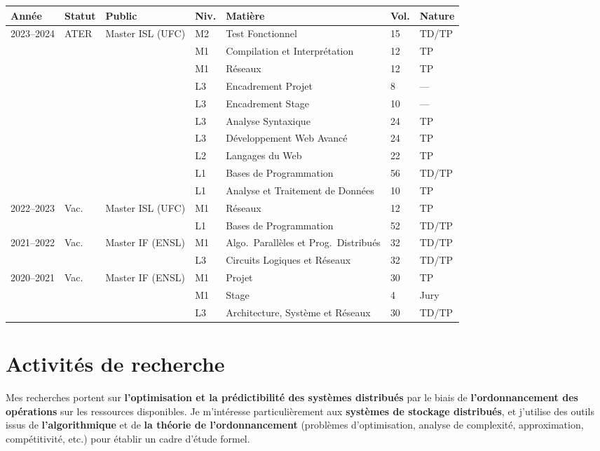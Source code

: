 \documentclass[12pt]{article}
\begin{document}
\begin{center}
    \footnotesize
    \begin{tabularx}{\linewidth}{p{2cm}lp{3cm}lXll}
        \toprule
        \textbf{Année} & \textbf{Statut} & \textbf{Public} & \textbf{Niv.} & \textbf{Matière} & \textbf{Vol.} & \textbf{Nature} \tabularnewline
        \midrule
        2023--2024 & ATER & Master ISL (UFC) & M2 & Test Fonctionnel & 15 & TD/TP \tabularnewline
        & & & M1 & Compilation et Interprétation & 12 & TP \tabularnewline
        & & & M1 & Réseaux & 12 & TP \tabularnewline
        & & & L3 & Encadrement Projet & 8 & --- \tabularnewline
        & & & L3 & Encadrement Stage & 10 & --- \tabularnewline
        & & & L3 & Analyse Syntaxique & 24 & TP \tabularnewline
        & & & L3 & Développement Web Avancé & 24 & TP \tabularnewline
        & & & L2 & Langages du Web & 22 & TP \tabularnewline
        & & & L1 & Bases de Programmation & 56 & TD/TP \tabularnewline
        & & & L1 & Analyse et Traitement de Données & 10 & TP \tabularnewline
        \midrule
        2022--2023 & Vac. & Master ISL (UFC) & M1 & Réseaux & 12 & TP \tabularnewline
        & & & L1 & Bases de Programmation & 52 & TD/TP \tabularnewline
        \midrule
        2021--2022 & Vac. & Master IF (ENSL) & M1 & Algo.\ Parallèles et Prog.\ Distribués & 32 & TD/TP \tabularnewline
        & & & L3 & Circuits Logiques et Réseaux & 32 & TD/TP \tabularnewline
        \midrule
        2020--2021 & Vac. & Master IF (ENSL) & M1 & Projet & 30 & TP \tabularnewline
        & & & M1 & Stage & 4 & Jury \tabularnewline
        & & & L3 & Architecture, Système et Réseaux & 30 & TD/TP \tabularnewline
        \bottomrule
    \end{tabularx}
\end{center}

\section{Activités de recherche}

Mes recherches portent sur \textbf{l'optimisation et la prédictibilité des systèmes distribués} par
le biais de \textbf{l'ordonnancement des opérations} sur les ressources disponibles.  
Je m'intéresse particulièrement aux \textbf{systèmes de stockage distribués}, et j'utilise des
outils issus de \textbf{l'algorithmique} et de \textbf{la théorie de l'ordonnancement} (problèmes
d'optimisation, analyse de complexité, approximation, compétitivité, etc.) pour établir un cadre
d'étude formel.
\end{document}
